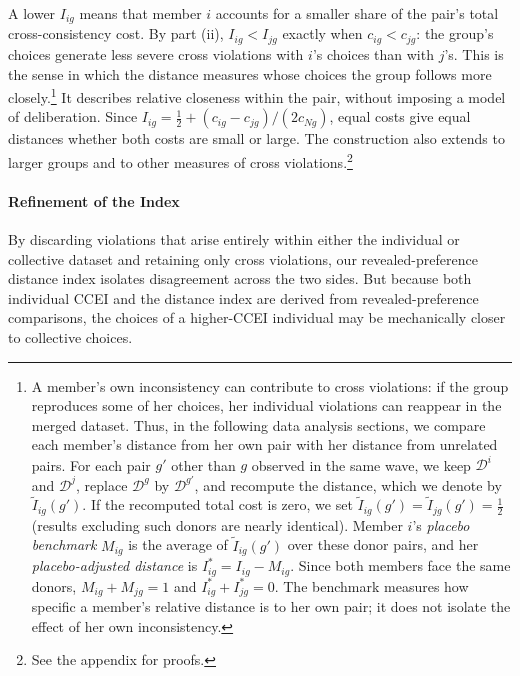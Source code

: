 \documentclass[11 pt]{article}
\begin{document}
A lower $I_{ig}$ means that member $i$ accounts for a smaller share of the pair's total cross-consistency cost. By part (ii), $I_{ig}<I_{jg}$ exactly when $c_{ig}<c_{jg}$: the group's choices generate less severe cross violations with $i$'s choices than with $j$'s. This is the sense in which the distance measures whose choices the group follows more closely.\footnote{A member's own inconsistency can contribute to cross violations: if the group reproduces some of her choices, her individual violations can reappear in the merged dataset. Thus, in the following data analysis sections, we compare each member's distance from her own pair with her distance from unrelated pairs. For each pair $g'$ other than $g$ observed in the same wave, we keep $\mathcal D^i$ and $\mathcal D^j$, replace $\mathcal D^g$ by $\mathcal D^{g'}$, and recompute the distance, which we denote by $\widetilde I_{ig}(g')$. If the recomputed total cost is zero, we set $\widetilde I_{ig}(g')=\widetilde I_{jg}(g')=\tfrac12$ (results excluding such donors are nearly identical). Member $i$'s \emph{placebo benchmark} $M_{ig}$ is the average of $\widetilde I_{ig}(g')$ over these donor pairs, and her \emph{placebo-adjusted distance} is $I^*_{ig}=I_{ig}-M_{ig}$. Since both members face the same donors, $M_{ig}+M_{jg}=1$ and $I^*_{ig}+I^*_{jg}=0$. The benchmark measures how specific a member's relative distance is to her own pair; it does not isolate the effect of her own inconsistency.} It describes relative closeness within the pair, without imposing a model of deliberation. Since $I_{ig}=\tfrac12+(c_{ig}-c_{jg})/(2c_{Ng})$, equal costs give equal distances whether both costs are small or large. The construction also extends to larger groups and to other measures of cross violations.\footnote{See the appendix for proofs.}

\paragraph{Refinement of the Index} By discarding violations that arise entirely within either the individual or collective dataset and retaining only cross violations, our revealed-preference distance index isolates disagreement across the two sides. But because both individual CCEI and the distance index are derived from revealed-preference comparisons, the choices of a higher-CCEI individual may be mechanically closer to collective choices.
\end{document}
